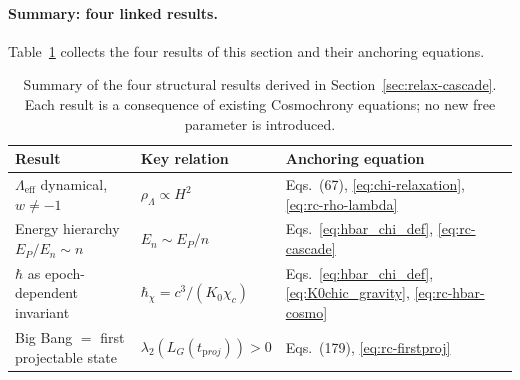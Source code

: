     \paragraph{Summary: four linked results.}
      Table~\ref{tab:rc-summary} collects the four results of this section
      and their anchoring equations.

    \begin{table}[h]
      \centering
      \caption{Summary of the four structural results derived in Section~\ref{sec:relax-cascade}.
      Each result is a consequence of existing Cosmochrony equations; no new free parameter is introduced.}
      \label{tab:rc-summary}
      \begin{tabular}{lll}
        \hline
        Result & Key relation & Anchoring equation \\
        \hline
        $\Lambda_{\mathrm{eff}}$ dynamical, $w \neq -1$
        & $\rho_\Lambda \propto H^2$
        & Eqs.~(67), \eqref{eq:chi-relaxation}, \eqref{eq:rc-rho-lambda} \\
        Energy hierarchy $E_P/E_n \sim n$
        & $E_n \sim E_P/n$
        & Eqs.~\eqref{eq:hbar_chi_def}, \eqref{eq:rc-cascade} \\
        $\hbar$ as epoch-dependent invariant
        & $\hbar_\chi = c^3/(K_0\chi_c)$
        & Eqs.~\eqref{eq:hbar_chi_def}, \eqref{eq:K0chic_gravity}, \eqref{eq:rc-hbar-cosmo} \\
        Big Bang $=$ first projectable state
        & $\lambda_2(L_G(t_{\mathrm proj})) > 0$
        & Eqs.~(179), \eqref{eq:rc-firstproj} \\
        \hline
      \end{tabular}
      \end{table}
